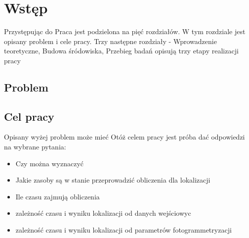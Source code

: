 
\graphicspath{ {./img/1_Intro/} }

\chapter{Wstęp}
Przystępując do
Praca jest podzielona na pięć rozdziałów. W tym rozdziale jest opisany problem i cele pracy. Trzy następne rozdziały - Wprowadzenie teoretyczne, Budowa śródowiska, Przebieg badań opisują trzy etapy realizacji pracy

\section{Problem}

\section{Cel pracy}
Opisany wyżej problem może mieć
Otóż celem pracy jest próba dać odpowiedzi na wybrane pytania:
\begin{itemize}
   \item Czy można wyznaczyć
   \item Jakie zasoby są w stanie przeprowadzić obliczenia dla lokalizacji
   \item Ile czasu zajmują obliczenia
   \item zależność czasu i wyniku lokalizacji od danych wejściowyc
   \item zależność czasu i wyniku lokalizacji od parametrów fotogrammetryzacji
\end{itemize}
